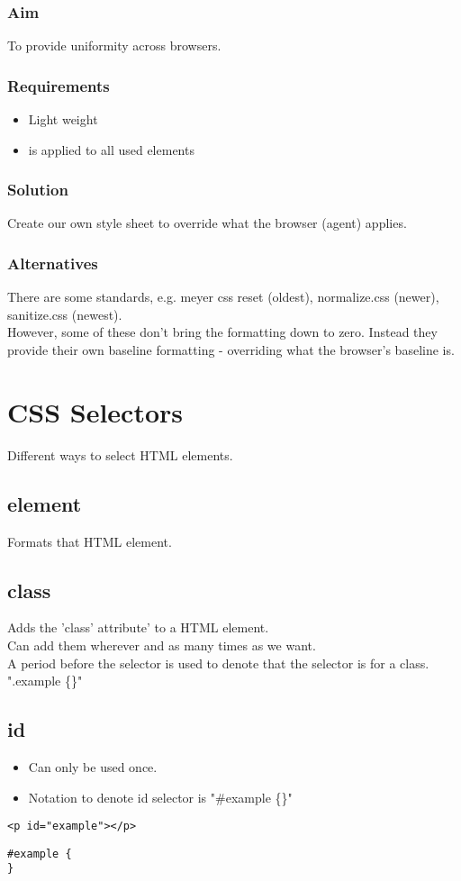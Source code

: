\documentclass[]{article}
\newcommand{\<}{\guilsinglleft}
\renewcommand{\>}{\guilsinglright}
\begin{document}
\subsubsection{Aim}
To provide uniformity across browsers.
\subsubsection{Requirements}
\begin{itemize}
	\item Light weight
	\item is applied to all used elements
\end{itemize}
\subsubsection{Solution}
Create our own style sheet to override what the browser (agent) applies.
\subsubsection{Alternatives}
There are some standards, e.g. meyer css reset (oldest), normalize.css (newer), sanitize.css (newest).  
\\
However, some of these don't bring the formatting down to zero.  Instead they provide their own baseline formatting - overriding what the browser's baseline is.

\section{CSS Selectors}
Different ways to select HTML elements.
\subsection{element}
Formats that HTML element.
\subsection{class}
Adds the 'class' attribute' to a HTML element.
\\
Can add them wherever and as many times as we want.
\\
A period before the selector is used to denote that the selector is for a class. ".example \{\}"

\subsection{id}
\begin{itemize}
	\item Can only be used once.
	\item Notation to denote id selector is "\#example \{\}" 
\end{itemize}
\begin{lstlisting}
<p id="example"></p>
\end{lstlisting}
\begin{lstlisting}
#example {
}
\end{lstlisting}
\end{document}
